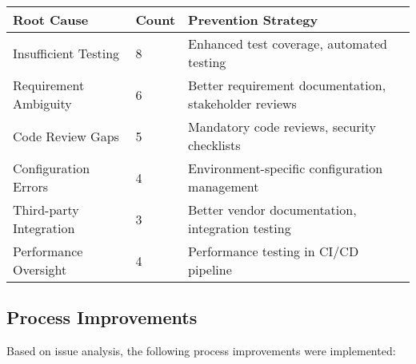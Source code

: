\documentclass[12pt,a4paper]{article}
\begin{document}
\begin{longtable}{|p{3.5cm}|p{1.5cm}|p{7.5cm}|}
\hline
\textbf{Root Cause} & \textbf{Count} & \textbf{Prevention Strategy} \\
\hline
Insufficient Testing & 8 & Enhanced test coverage, automated testing \\
\hline
Requirement Ambiguity & 6 & Better requirement documentation, stakeholder reviews \\
\hline
Code Review Gaps & 5 & Mandatory code reviews, security checklists \\
\hline
Configuration Errors & 4 & Environment-specific configuration management \\
\hline
Third-party Integration & 3 & Better vendor documentation, integration testing \\
\hline
Performance Oversight & 4 & Performance testing in CI/CD pipeline \\
\hline
\end{longtable}

\subsection{Process Improvements}

Based on issue analysis, the following process improvements were implemented:
\end{document}
